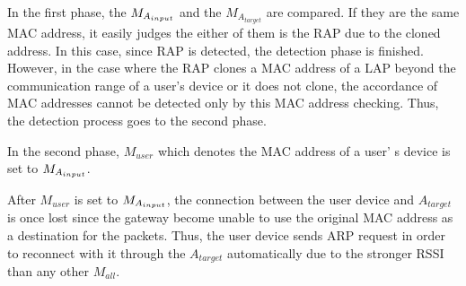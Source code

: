 \documentclass[conference]{IEEEtran}
\newcommand{\tarMAC}{M_{A_{target}}}
\newcommand{\userMAC}{M_{user}}
\newcommand{\tarAP}{A_{target}}
\begin{document}
In the first phase, the $M_{A_{input}}$ and the $\tarMAC$ are compared.
If they are the same MAC address, it easily judges the either of them is the RAP due to the cloned address.
In this case, since RAP is detected, the detection phase is finished.
However, in the case where the RAP clones a MAC address of a LAP beyond the communication range of a user's device or it does not clone, the accordance of MAC addresses cannot be detected only by this MAC address checking.
Thus, the detection process goes to the second phase.

In the second phase, $\userMAC$ which denotes the MAC address of a user' s device is set to $M_{A_{input}}$.

After $\userMAC$ is set to $M_{A_{input}}$, the connection between the user device and $\tarAP$ is once lost since the gateway become unable to use the original MAC address as a destination for the packets.
Thus, the user device sends ARP request in order to reconnect with it through the $\tarAP$ automatically due to the stronger RSSI than any other $M_{all}$.
\end{document}
